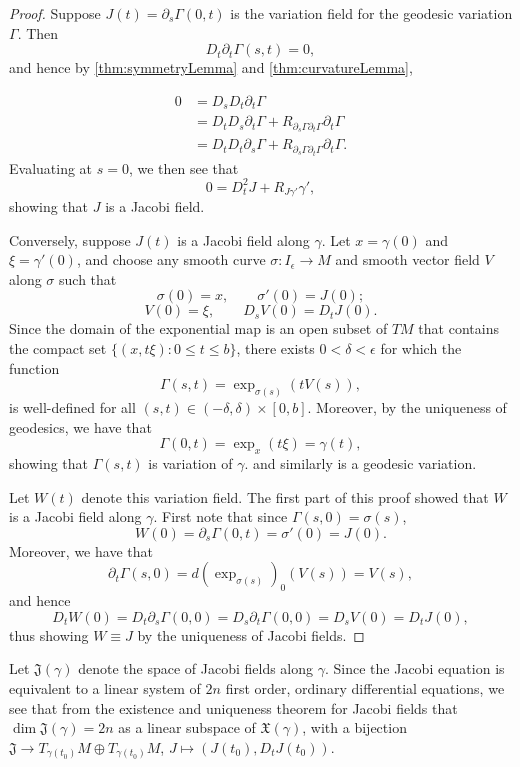 \begin{proof}
Suppose $J(t)=\partial_s\Gamma(0,t)$ is the variation field for the geodesic variation $\Gamma$.  Then
$$D_t\partial_t\Gamma(s,t)=0,$$
and hence by \cref{thm:symmetryLemma} and \cref{thm:curvatureLemma},

\begin{align*}
	0&=D_sD_t\partial_t\Gamma\\
	&=D_tD_s\partial_t\Gamma+R_{\partial_s\Gamma\partial_t\Gamma}\partial_t\Gamma\\
	&=D_tD_t\partial_s\Gamma+R_{\partial_s\Gamma\partial_t\Gamma}\partial_t\Gamma.
\end{align*}
Evaluating at $s=0$, we then see that
$$0=D_t^2J+R_{J\gamma'}\gamma',$$
showing that $J$ is a Jacobi field.

Conversely, suppose $J(t)$ is a Jacobi field along $\gamma$.  Let $x=\gamma(0)$ and $\xi=\gamma'(0)$, and choose any smooth curve $\sigma:I_\epsilon\to M$ and smooth vector field $V$ along $\sigma$ such that
$$\sigma(0)=x,\qquad \sigma'(0)=J(0);$$
$$V(0)=\xi,\qquad D_sV(0)=D_tJ(0).$$
Since the domain of the exponential map is an open subset of $TM$ that contains the compact set $\{(x,t\xi):0\leq t\leq b\}$, there exists $0<\delta<\epsilon$ for which the function
$$\Gamma(s,t)=\exp_{\sigma(s)}(tV(s)),$$
is well-defined for all $(s,t)\in(-\delta,\delta)\times[0,b]$.  Moreover, by the uniqueness of geodesics, we have that
$$\Gamma(0,t)=\exp_x(t\xi)=\gamma(t),$$
showing that $\Gamma(s,t)$ is variation of $\gamma$. and similarly is a geodesic variation.  

Let $W(t)$ denote this variation field.  The first part of this proof showed that $W$ is a Jacobi field along $\gamma$.  First note that since $\Gamma(s,0)=\sigma(s)$,
$$W(0)=\partial_s\Gamma(0,t)=\sigma'(0)=J(0).$$
Moreover, we have that
$$\partial_t\Gamma(s,0)=d(\exp_{\sigma(s)})_0(V(s))=V(s),$$
and hence
$$D_tW(0)=D_t\partial_s\Gamma(0,0)=D_s\partial_t\Gamma(0,0)=D_sV(0)=D_tJ(0),$$
thus showing $W\equiv J$ by the uniqueness of Jacobi fields.

\end{proof}

Let $\mathfrak{J}(\gamma)$ denote the space of Jacobi fields along $\gamma$.  Since the Jacobi equation is equivalent to a linear system of $2n$ first order, ordinary differential equations, we see that from the existence and uniqueness theorem for Jacobi fields that $\dim{\mathfrak{J}}(\gamma)=2n$ as a linear subspace of $\mathfrak{X}(\gamma)$, with a bijection $\mathfrak{J}\to T_{\gamma(t_0)}M\oplus T_{\gamma(t_0)}M$, $J\mapsto (J(t_0), D_tJ(t_0))$.

